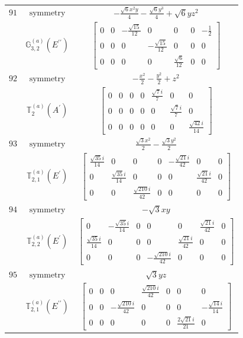 \documentclass[fleqn,8pt,landscape]{jsarticle}
\begin{document}
\begin{longtable}{ccc}
$ 91 $ & $ \text{symmetry} $ & $ - \frac{\sqrt{6} x^{2} y}{4} - \frac{\sqrt{6} y^{3}}{4} + \sqrt{6} y z^{2} $ \\
$  $ & $ \mathbb{G}_{3,2}^{(a)}(E^{\prime\prime}) $ & $ \begin{bmatrix} 0 & 0 & - \frac{\sqrt{15}}{12} & 0 & 0 & 0 & - \frac{1}{2} \\ 0 & 0 & 0 & - \frac{\sqrt{15}}{12} & 0 & 0 & 0 \\ 0 & 0 & 0 & 0 & \frac{\sqrt{6}}{12} & 0 & 0 \end{bmatrix} $ \\ \hline
$ 92 $ & $ \text{symmetry} $ & $ - \frac{x^{2}}{2} - \frac{y^{2}}{2} + z^{2} $ \\
$  $ & $ \mathbb{T}_{2}^{(a)}(A^{\prime}) $ & $ \begin{bmatrix} 0 & 0 & 0 & 0 & \frac{\sqrt{7} i}{7} & 0 & 0 \\ 0 & 0 & 0 & 0 & 0 & \frac{\sqrt{7} i}{7} & 0 \\ 0 & 0 & 0 & 0 & 0 & 0 & \frac{\sqrt{42} i}{14} \end{bmatrix} $ \\ \hline
$ 93 $ & $ \text{symmetry} $ & $ \frac{\sqrt{3} x^{2}}{2} - \frac{\sqrt{3} y^{2}}{2} $ \\
$  $ & $ \mathbb{T}_{2,1}^{(a)}(E^{\prime}) $ & $ \begin{bmatrix} \frac{\sqrt{35} i}{14} & 0 & 0 & 0 & - \frac{\sqrt{21} i}{42} & 0 & 0 \\ 0 & \frac{\sqrt{35} i}{14} & 0 & 0 & 0 & \frac{\sqrt{21} i}{42} & 0 \\ 0 & 0 & \frac{\sqrt{210} i}{42} & 0 & 0 & 0 & 0 \end{bmatrix} $ \\ \hline
$ 94 $ & $ \text{symmetry} $ & $ - \sqrt{3} x y $ \\
$  $ & $ \mathbb{T}_{2,2}^{(a)}(E^{\prime}) $ & $ \begin{bmatrix} 0 & - \frac{\sqrt{35} i}{14} & 0 & 0 & 0 & \frac{\sqrt{21} i}{42} & 0 \\ \frac{\sqrt{35} i}{14} & 0 & 0 & 0 & \frac{\sqrt{21} i}{42} & 0 & 0 \\ 0 & 0 & 0 & - \frac{\sqrt{210} i}{42} & 0 & 0 & 0 \end{bmatrix} $ \\ \hline
$ 95 $ & $ \text{symmetry} $ & $ \sqrt{3} y z $ \\
$  $ & $ \mathbb{T}_{2,1}^{(a)}(E^{\prime\prime}) $ & $ \begin{bmatrix} 0 & 0 & 0 & \frac{\sqrt{210} i}{42} & 0 & 0 & 0 \\ 0 & 0 & - \frac{\sqrt{210} i}{42} & 0 & 0 & 0 & - \frac{\sqrt{14} i}{14} \\ 0 & 0 & 0 & 0 & 0 & \frac{2 \sqrt{21} i}{21} & 0 \end{bmatrix} $ \\ \hline

\end{longtable}
\end{document}
